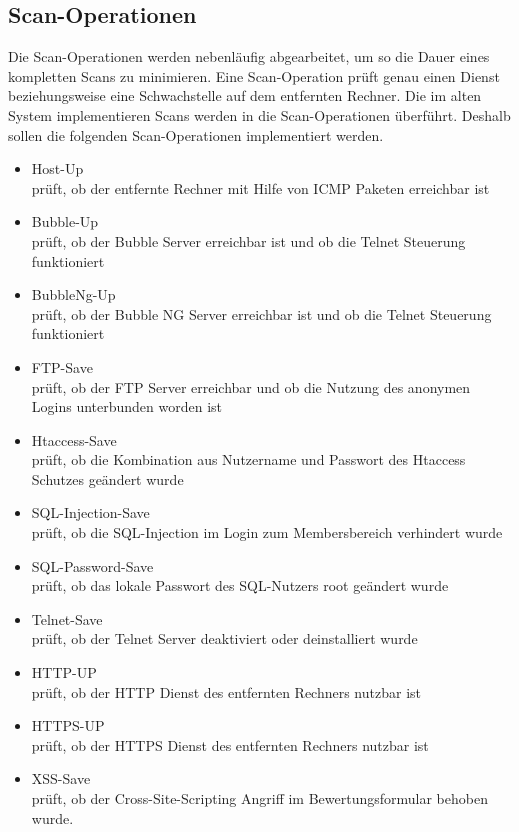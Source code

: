 \subsection{Scan-Operationen}

Die Scan-Operationen werden nebenläufig abgearbeitet, um so die Dauer eines kompletten Scans zu minimieren. Eine Scan-Operation prüft genau einen Dienst beziehungsweise eine Schwachstelle auf dem entfernten Rechner. Die im alten System implementieren Scans werden in die Scan-Operationen überführt. Deshalb sollen die folgenden Scan-Operationen implementiert werden.

\begin{itemize}
	\item Host-Up \\
	prüft, ob der entfernte Rechner mit Hilfe von ICMP Paketen erreichbar ist
	\item Bubble-Up \\
	prüft, ob der Bubble Server erreichbar ist und ob die Telnet Steuerung funktioniert
	\item BubbleNg-Up\\
	prüft, ob der Bubble NG Server erreichbar ist und ob die Telnet Steuerung funktioniert
	\item FTP-Save\\
	prüft, ob der FTP Server erreichbar und ob die Nutzung des anonymen Logins unterbunden worden ist
	\item Htaccess-Save\\
	prüft, ob die Kombination aus Nutzername und Passwort des Htaccess Schutzes geändert wurde
	\item SQL-Injection-Save\\
	prüft, ob die SQL-Injection im Login zum Membersbereich verhindert wurde
	\item SQL-Password-Save\\
	prüft, ob das lokale Passwort des SQL-Nutzers root geändert wurde
	\item Telnet-Save\\
	prüft, ob der Telnet Server deaktiviert oder deinstalliert wurde
	\item HTTP-UP\\
	prüft, ob der HTTP Dienst des entfernten Rechners nutzbar ist
	\item HTTPS-UP\\
	prüft, ob der HTTPS Dienst des entfernten Rechners nutzbar ist
	\item XSS-Save\\
	prüft, ob der Cross-Site-Scripting Angriff im Bewertungsformular behoben wurde.
\end{itemize}

